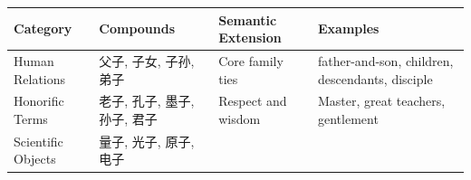 \begin{longtable}[]{@{}llll@{}}
\toprule
\begin{minipage}[b]{0.17\columnwidth}\raggedright
Category\strut
\end{minipage} & \begin{minipage}[b]{0.19\columnwidth}\raggedright
Compounds\strut
\end{minipage} & \begin{minipage}[b]{0.33\columnwidth}\raggedright
Semantic Extension\strut
\end{minipage} & \begin{minipage}[b]{0.19\columnwidth}\raggedright
Examples\strut
\end{minipage}\tabularnewline
\midrule
\endhead
\begin{minipage}[t]{0.17\columnwidth}\raggedright
Human Relations\strut
\end{minipage} & \begin{minipage}[t]{0.19\columnwidth}\raggedright
父子, 子女, 子孙, 弟子\strut
\end{minipage} & \begin{minipage}[t]{0.33\columnwidth}\raggedright
Core family ties\strut
\end{minipage} & \begin{minipage}[t]{0.19\columnwidth}\raggedright
father-and-son, children, descendants, disciple\strut
\end{minipage}\tabularnewline
\begin{minipage}[t]{0.17\columnwidth}\raggedright
Honorific Terms\strut
\end{minipage} & \begin{minipage}[t]{0.19\columnwidth}\raggedright
老子, 孔子, 墨子, 孙子, 君子\strut
\end{minipage} & \begin{minipage}[t]{0.33\columnwidth}\raggedright
Respect and wisdom\strut
\end{minipage} & \begin{minipage}[t]{0.19\columnwidth}\raggedright
Master, great teachers, gentlement\strut
\end{minipage}\tabularnewline
\begin{minipage}[t]{0.17\columnwidth}\raggedright
Scientific Objects\strut
\end{minipage} & \begin{minipage}[t]{0.19\columnwidth}\raggedright
量子, 光子, 原子, 电子\strut
\end{minipage} & \begin{minipage}[t]{0.33\columnwidth}\raggedright

\end{minipage}
\end{longtable}
